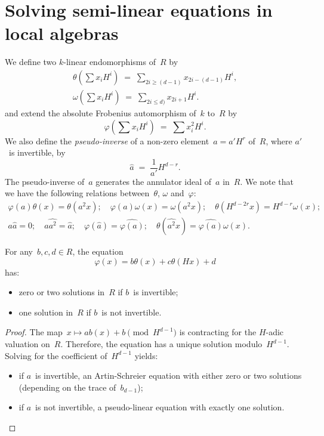 \documentclass{llncs}
\begin{document}
\section{Solving semi-linear equations in local algebras}
We define two $k$-linear endomorphisms of~$R$
by
\begin{gather*}
θ(∑ x_i H^i) \;=\; ∑_{2i ≥ (d-1)} x_{2i-(d-1)} H^i,\\
ω(∑ x_i H^i) \;=\; ∑_{2i ≤ d)} x_{2i+1} H^{i}.
\end{gather*}
and extend the absolute Frobenius automorphism of~$k$ to~$R$ by
\begin{equation}
φ(∑ x_i H^i) \;=\; ∑ x_{i}^2 H^i.
\end{equation}
We also define the \emph{pseudo-inverse} of a non-zero element~$a = a'
H^r$ of~$R$, where $a'$~is invertible, by
\begin{equation}\label{eq:pseudo-inv}
\widehat{a} \;=\; \frac{1}{a'} H^{d-r}.
\end{equation}
The pseudo-inverse of~$a$ generates the annulator ideal of~$a$ in~$R$.
We note that we have the following relations between~$θ$, $ω$ and~$φ$:
\begin{gather*}\label{eq:theta-omega}
φ(a) θ(x) = θ(a^2 x); \quad
φ(a) ω(x) = ω(a^2 x); \quad
θ(H^{d-2r} x) = H^{d-r} ω(x);\\
a \widehat{a} = 0; \quad a \widehat{a^2} = \widehat{a};\quad
φ(\widehat{a}) = \widehat{φ(a)};\quad
θ(\widehat{a^2} x) = \widehat{φ(a)} ω(x).
\end{gather*}


\begin{proposition}\label{prop:contracting}
For any~$b, c, d ∈ R$, the equation
\begin{equation}
φ(x) = b θ(x) + c θ(Hx) + d
\end{equation}
has:
\begin{itemize}
\item zero or two solutions in~$R$ if $b$~is invertible;
\item one solution in~$R$ if $b$~is not invertible.
\end{itemize}
\end{proposition}


\begin{proof}
The map~$x ↦ a b(x) + b \pmod{H^{d-1}}$ is contracting for the $H$-adic
valuation on~$R$. Therefore, the equation has a unique solution
modulo~$H^{d-1}$. Solving for the coefficient of~$H^{d-1}$ yields:
\begin{itemize}
\item if $a$~is invertible, an Artin-Schreier equation with either zero or
two solutions (depending on the trace of~$b_{d-1}$);
\item if $a$~is not invertible, a pseudo-linear equation with exactly one
solution.
\end{itemize}
\end{proof}
\end{document}
